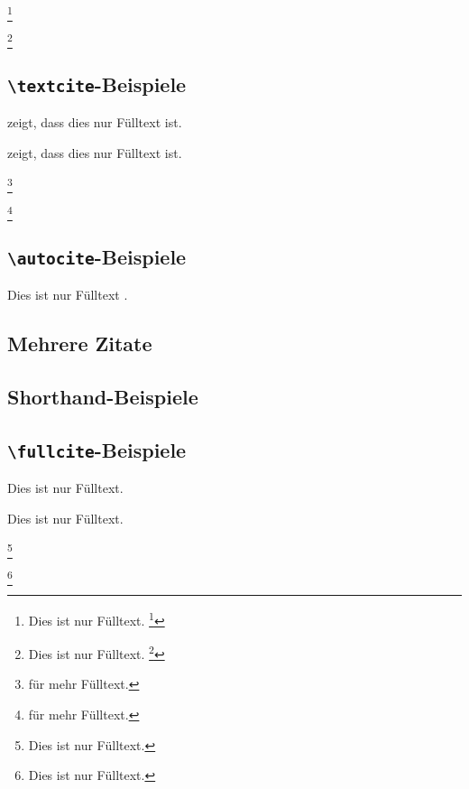 \documentclass[a4paper]{article}
\newcommand{\cmd}[1]{\texttt{\textbackslash #1}}
\begin{document}
\footnote{Dies ist nur Fülltext. \footcite[Siehe][]{springer}}

\footnote{Dies ist nur Fülltext. \footcite[Siehe][92--95]{springer}}

\subsection*{\cmd{textcite}-Beispiele}

\textcite{aristotle:rhetoric} zeigt, dass dies nur Fülltext ist.

\textcite[59]{aristotle:rhetoric} zeigt, dass dies nur Fülltext ist.

\footnote{\textcite[Siehe][]{springer} für mehr Fülltext.}

\footnote{\textcite[Siehe][92--95]{springer} für mehr Fülltext.}

\subsection*{\cmd{autocite}-Beispiele}

Dies ist nur Fülltext \autocite{springer}.

\subsection*{Mehrere Zitate}

\cite{aristotle:rhetoric,aristotle:physics,aristotle:poetics}

\subsection*{Shorthand-Beispiele}

\cite{Annales-Quedlinburgenses}

\cite[25]{kant:kpv}

\cite[noch einmal]{kant:kpv}

\cite{Annales-Quedlinburgenses}

\subsection*{\cmd{fullcite}-Beispiele}

Dies ist nur Fülltext. 

Dies ist nur Fülltext. 

\footnote{Dies ist nur Fülltext. }

\footnote{Dies ist nur Fülltext. }
\end{document}

